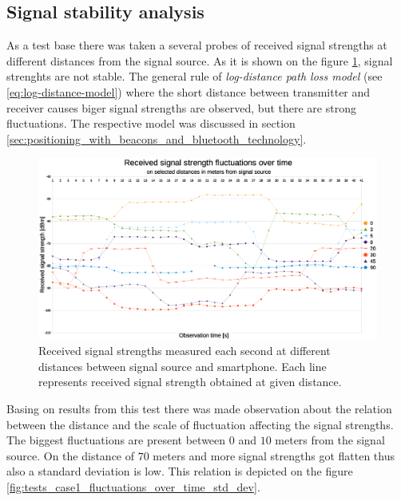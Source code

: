 \documentclass[../main.tex]{subfiles}
\begin{document}
\subsection{Signal stability analysis} %
\label{sub:signal_stability_analysis}

As a test base there was taken a several probes of received signal strengths at different distances from the signal source. As it is shown on the figure \ref{fig:tests_case1_fluctuations_over_time}, signal strenghts are not stable. The general rule of \textit{log-distance path loss model} (see \ref{eq:log-distance-model}) where the short distance between transmitter and receiver causes biger signal strengths are observed, but there are strong fluctuations. The respective model was discussed in section \ref{sec:positioning_with_beacons_and_bluetooth_technology}.

\begin{figure}[!htbp]
\includegraphics[width=\textwidth, keepaspectratio]{pictures/tests_case1_fluctuations_over_time}
\centering
\caption{Received signal strengths measured each second at different distances between signal source and smartphone. Each line represents received signal strength obtained at given distance.}
\label{fig:tests_case1_fluctuations_over_time}
\end{figure}

Basing on results from this test there was made observation about the relation between the distance and the scale of fluctuation affecting the signal strengths. The biggest fluctuations are present between $0$ and $10$ meters from the signal source. On the distance of $70$ meters and more signal strengths got flatten thus also a standard deviation is low. This relation is depicted on the figure \ref{fig:tests_case1_fluctuations_over_time_std_dev}.
\end{document}
